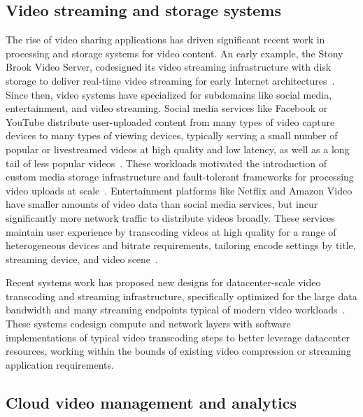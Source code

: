 \subsection{Video streaming and storage systems}
\label{sec:related:streaming}

The rise of video sharing applications has driven significant recent work in processing and storage systems for video content.
An early example, the Stony Brook Video Server, codesigned its video streaming infrastructure with disk storage to deliver real-time video streaming for early Internet architectures~\cite{vernick1996stonybrook}.
Since then, video systems have specialized for subdomains like social media, entertainment, and video streaming.
Social media services like Facebook or YouTube distribute user-uploaded content from many types of video capture devices to many types of viewing devices, typically serving a small number of popular or livestreamed videos at high quality and low latency, as well as a long tail of less popular videos~\cite{fblive, tang2017popularvid}.
These workloads motivated the introduction of custom media storage infrastructure and fault-tolerant frameworks for processing video uploads at scale~\cite{beaver2010haystack, muralidhar2014f4, huang2017sve, vbench}.
Entertainment platforms like Netflix and Amazon Video have smaller amounts of video data than social media services, but incur significantly more network traffic to distribute videos broadly.
These services maintain user experience by transcoding videos at high quality for a range of heterogeneous devices and bitrate requirements, tailoring encode settings by title, streaming device, and video scene~\cite{netflix2016mobilecoding,netflix2015pertitle,netflix2018dynamicopt,netflix2018shotbased}.

Recent systems work has proposed new designs for datacenter-scale video transcoding and streaming infrastructure, specifically optimized for the large data bandwidth and many streaming endpoints typical of modern video workloads~\cite{fouladi2017excamera, fouladi2018salsify,liu2016greenvid, asicclouds}.
These systems codesign compute and network layers with software implementations of typical video transcoding steps to better leverage datacenter resources, working within the bounds of existing video compression or streaming application requirements.

\subsection{Cloud video management and analytics}
\label{sec:related:vdbms}


